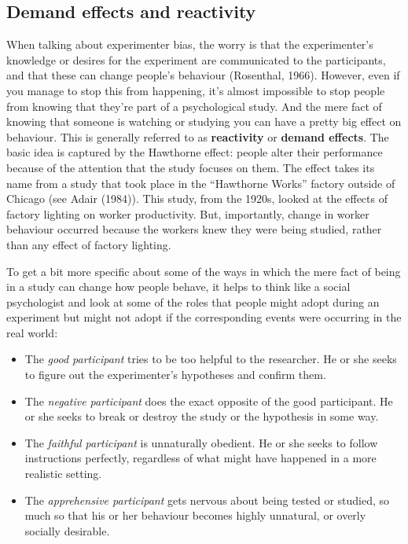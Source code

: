 \documentclass[
  a4paper,
]{book}
\providecommand{\tightlist}{%
  \setlength{\itemsep}{0pt}\setlength{\parskip}{0pt}}
\begin{document}
\subsection{Demand effects and
reactivity}\label{demand-effects-and-reactivity}

When talking about experimenter bias, the worry is that the
experimenter's knowledge or desires for the experiment are communicated
to the participants, and that these can change people's behaviour
(Rosenthal, 1966). However, even if you manage to stop this from
happening, it's almost impossible to stop people from knowing that
they're part of a psychological study. And the mere fact of knowing that
someone is watching or studying you can have a pretty big effect on
behaviour. This is generally referred to as \textbf{reactivity} or
\textbf{demand effects}. The basic idea is captured by the Hawthorne
effect: people alter their performance because of the attention that the
study focuses on them. The effect takes its name from a study that took
place in the ``Hawthorne Works'' factory outside of Chicago (see Adair
(1984)). This study, from the 1920s, looked at the effects of factory
lighting on worker productivity. But, importantly, change in worker
behaviour occurred because the workers knew they were being studied,
rather than any effect of factory lighting.

To get a bit more specific about some of the ways in which the mere fact
of being in a study can change how people behave, it helps to think like
a social psychologist and look at some of the roles that people might
adopt during an experiment but might not adopt if the corresponding
events were occurring in the real world:

\begin{itemize}
\tightlist
\item
  The \emph{good participant} tries to be too helpful to the researcher.
  He or she seeks to figure out the experimenter's hypotheses and
  confirm them.
\item
  The \emph{negative participant} does the exact opposite of the good
  participant. He or she seeks to break or destroy the study or the
  hypothesis in some way.
\item
  The \emph{faithful participant} is unnaturally obedient. He or she
  seeks to follow instructions perfectly, regardless of what might have
  happened in a more realistic setting.
\item
  The \emph{apprehensive participant} gets nervous about being tested or
  studied, so much so that his or her behaviour becomes highly
  unnatural, or overly socially desirable.
\end{itemize}
\end{document}
